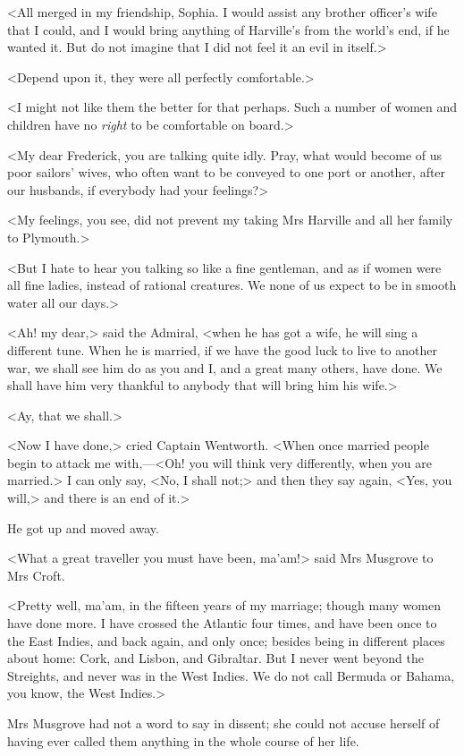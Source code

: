 <All merged in my friendship, Sophia. I would assist any brother officer's wife that I could, and I would bring anything of Harville's from the world's end, if he wanted it. But do not imagine that I did not feel it an evil in itself.>

<Depend upon it, they were all perfectly comfortable.>

<I might not like them the better for that perhaps. Such a number of women and children have no \textit{right} to be comfortable on board.>

<My dear Frederick, you are talking quite idly. Pray, what would become of us poor sailors' wives, who often want to be conveyed to one port or another, after our husbands, if everybody had your feelings?>

<My feelings, you see, did not prevent my taking Mrs Harville and all her family to Plymouth.>

<But I hate to hear you talking so like a fine gentleman, and as if women were all fine ladies, instead of rational creatures. We none of us expect to be in smooth water all our days.>

<Ah! my dear,> said the Admiral, <when he has got a wife, he will sing a different tune. When he is married, if we have the good luck to live to another war, we shall see him do as you and I, and a great many others, have done. We shall have him very thankful to anybody that will bring him his wife.>

<Ay, that we shall.>

<Now I have done,> cried Captain Wentworth. <When once married people begin to attack me with,—<Oh! you will think very differently, when you are married.> I can only say, <No, I shall not;> and then they say again, <Yes, you will,> and there is an end of it.>

He got up and moved away.

<What a great traveller you must have been, ma'am!> said Mrs Musgrove to Mrs Croft.

<Pretty well, ma'am, in the fifteen years of my marriage; though many women have done more. I have crossed the Atlantic four times, and have been once to the East Indies, and back again, and only once; besides being in different places about home: Cork, and Lisbon, and Gibraltar. But I never went beyond the Streights, and never was in the West Indies. We do not call Bermuda or Bahama, you know, the West Indies.>

Mrs Musgrove had not a word to say in dissent; she could not accuse herself of having ever called them anything in the whole course of her life.

